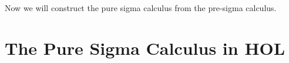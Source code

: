 \documentclass[envcountsame,runningheads]{llncs}
\begin{document}
%
%
%



Now we will construct the pure sigma calculus from the pre-sigma calculus.


%
\section{The Pure Sigma Calculus in HOL}
%
\label{puresigmacalculus}
\end{document}
